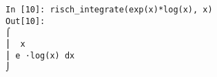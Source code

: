 ﻿\documentclass{article}
\begin{document}
\normalsize
\begin{Verbatim}
In [10]: risch_integrate(exp(x)*log(x), x)
Out[10]: 
⌠             
⎮  x          
⎮ e ⋅log(x) dx
⌡             
\end{Verbatim}
\end{document}

